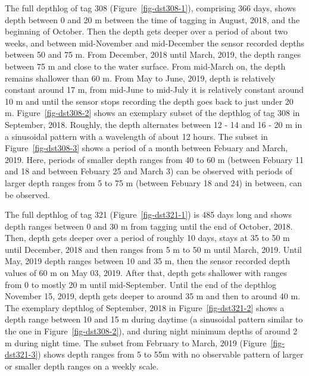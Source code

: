 \documentclass[
  authoryear,
  review,
  3p]{elsarticle}
\begin{document}
The full depthlog of tag 308 (Figure~\ref{fig-dst308-1}), comprising 366
days, shows depth between 0 and 20 m between the time of tagging in
August, 2018, and the beginning of October. Then the depth gets deeper
over a period of about two weeks, and between mid-November and
mid-December the sensor recorded depths between 50 and 75 m. From
December, 2018 until March, 2019, the depth ranges between 75 m and
close to the water surface. From mid-March on, the depth remains
shallower than 60 m. From May to June, 2019, depth is relatively
constant around 17 m, from mid-June to mid-July it is relatively
constant around 10 m and until the sensor stops recording the depth goes
back to just under 20 m. Figure~\ref{fig-dst308-2} shows an exemplary
subset of the depthlog of tag 308 in September, 2018. Roughly, the depth
alternates between 12 - 14 and 16 - 20 m in a sinusoidal pattern with a
wavelength of about 12 hours. The subset in Figure~\ref{fig-dst308-3}
shows a period of a month between Febuary and March, 2019. Here, periods
of smaller depth ranges from 40 to 60 m (between Febuary 11 and 18 and
between Febuary 25 and March 3) can be observed with periods of larger
depth ranges from 5 to 75 m (between Febuary 18 and 24) in between, can
be observed.

The full depthlog of tag 321 (Figure~\ref{fig-dst321-1}) is 485 days
long and shows depth ranges between 0 and 30 m from tagging until the
end of October, 2018. Then, depth gets deeper over a period of roughly
10 days, stays at 35 to 50 m until December, 2018 and then ranges from 5
m to 50 m until March, 2019. Until May, 2019 depth ranges between 10 and
35 m, then the sensor recorded depth values of 60 m on May 03, 2019.
After that, depth gets shallower with ranges from 0 to mostly 20 m until
mid-September. Until the end of the depthlog November 15, 2019, depth
gets deeper to around 35 m and then to around 40 m. The exemplary
depthlog of September, 2018 in Figure~\ref{fig-dst321-2} shows a depth
range between 10 and 15 m during daytime (a sinusoidal pattern similar
to the one in Figure~\ref{fig-dst308-2}), and during night minimum
depths of around 2 m during night time. The subset from February to
March, 2019 (Figure~\ref{fig-dst321-3}) shows depth ranges from 5 to 55m
with no observable pattern of larger or smaller depth ranges on a weekly
scale.
\end{document}
